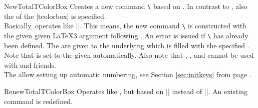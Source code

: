 \begin{docCommand}{NewTotalTColorBox}{}
  Creates a new command \texttt{\textbackslash} based on .
  In contrast to , also the  of the |tcolorbox| is specified.\\
  Basically,  operates like |\NewDocumentCommand|. This means,
  the new command \texttt{\textbackslash} is constructed with the given
  given \LaTeX3 argument  following \cite{latexproject:usrguide}.
  An error is issued if \texttt{\textbackslash} has already been defined.
  The  are given to the underlying  which is filled with
  the specified .\\
  Note that  is set to the given 
  automatically.
  Also note that , ,
  and 
  cannot be used with  and friends.\\
  The  allow setting up automatic numbering,
  see Section \ref{sec:initkeys} from page \pageref{sec:initkeys}.

\end{docCommand}

\begin{docCommand}{RenewTotalTColorBox}{}
  Operates like , but based on |\RenewDocumentCommand| instead of |\NewDocumentCommand|.
  An existing command is redefined.
\end{docCommand}

